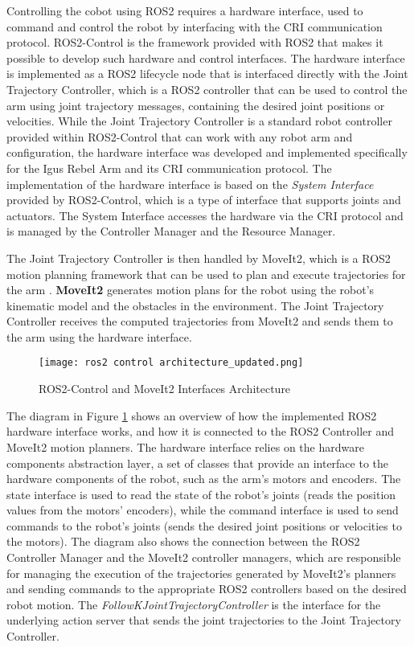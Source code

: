 Controlling the cobot using ROS2 requires a hardware interface, used to command and control the robot by interfacing
with the CRI communication protocol. ROS2-Control is the framework provided with ROS2 that makes it possible to develop such
hardware and control interfaces. The hardware interface is implemented as a ROS2 lifecycle node that
is interfaced directly with the Joint Trajectory Controller, which is a ROS2 controller that can be used to
control the arm using joint trajectory messages, containing the desired joint positions or velocities.
While the Joint Trajectory Controller is a standard robot controller provided within ROS2-Control that can work
with any robot arm and configuration, the hardware interface was developed and implemented specifically for the Igus Rebel Arm
and its CRI communication protocol. The implementation of the hardware interface is based on the \textit{System Interface}
provided by ROS2-Control, which is a type of interface that supports joints and actuators. The System Interface
accesses the hardware via the CRI protocol and is managed by the Controller Manager and the Resource Manager.

The Joint Trajectory Controller is then handled by MoveIt2, which is a ROS2
motion planning framework that can be used to plan and execute trajectories for the arm \cite{moveit2}.
\textbf{MoveIt2} generates motion plans for the robot using the robot's kinematic model and the obstacles in the environment.
The Joint Trajectory Controller receives the computed trajectories from MoveIt2 and sends them to the arm 
using the hardware interface.

\begin{figure}[t]
    \centering
    \texttt{[image: ros2 control architecture\_updated.png]}
    \caption{ROS2-Control and MoveIt2 Interfaces Architecture}
    \label{fig:ros2control}
\end{figure}

The diagram in Figure \ref{fig:ros2control} shows an overview of how the implemented ROS2 hardware interface works,
and how it is connected to the ROS2 Controller and MoveIt2 motion planners. The hardware interface relies on the
hardware components abstraction layer, a set of classes that provide an interface to the hardware components
of the robot, such as the arm's motors and encoders. The state interface is used to read the state of the robot's joints
(reads the position values from the motors' encoders), while the command interface is used to send commands to the robot's
joints (sends the desired joint positions or velocities to the motors).
The diagram also shows the connection between the ROS2 Controller Manager and the MoveIt2 controller managers,
which are responsible for managing the execution of the trajectories generated by MoveIt2's planners and sending commands
to the appropriate ROS2 controllers based on the desired robot motion. The \textit{FollowKJointTrajectoryController}
is the interface for the underlying action server that sends the joint trajectories to the Joint Trajectory Controller.

